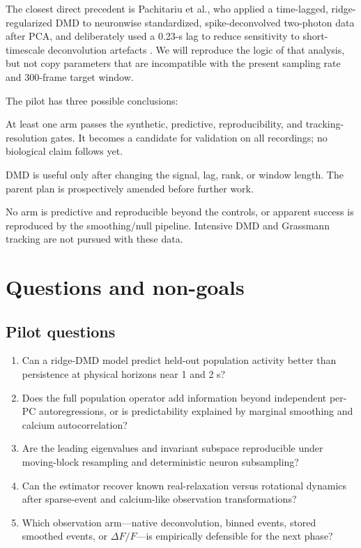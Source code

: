 \documentclass[11pt,a4paper]{article}
\begin{document}
The closest direct precedent is Pachitariu et al., who applied a time-lagged,
ridge-regularized DMD to neuronwise standardized, spike-deconvolved two-photon
data after PCA, and deliberately used a 0.23-s lag to reduce sensitivity to
short-timescale deconvolution artefacts \citep{pachitariu2026critical}. We will
reproduce the logic of that analysis, but not copy parameters that are
incompatible with the present sampling rate and 300-frame target window.

The pilot has three possible conclusions:

\begin{description}[style=nextline,leftmargin=1.7em]
  \item[PASS to expanded validation.] At least one arm passes the synthetic,
  predictive, reproducibility, and tracking-resolution gates. It becomes a
  candidate for validation on all recordings; no biological claim follows yet.
  \item[REVISE.] DMD is useful only after changing the signal, lag, rank, or
  window length. The parent plan is prospectively amended before further work.
  \item[STOP.] No arm is predictive and reproducible beyond the controls, or
  apparent success is reproduced by the smoothing/null pipeline. Intensive DMD
  and Grassmann tracking are not pursued with these data.
\end{description}

\section{Questions and non-goals}

\subsection{Pilot questions}

\begin{enumerate}
  \item Can a ridge-DMD model predict held-out population activity better than
  persistence at physical horizons near 1 and 2 s?
  \item Does the full population operator add information beyond independent
  per-PC autoregressions, or is predictability explained by marginal smoothing
  and calcium autocorrelation?
  \item Are the leading eigenvalues and invariant subspace reproducible under
  moving-block resampling and deterministic neuron subsampling?
  \item Can the estimator recover known real-relaxation versus rotational
  dynamics after sparse-event and calcium-like observation transformations?
  \item Which observation arm---native deconvolution, binned events, stored
  smoothed events, or $\Delta F/F$---is empirically defensible for the next phase?
\end{enumerate}
\end{document}
